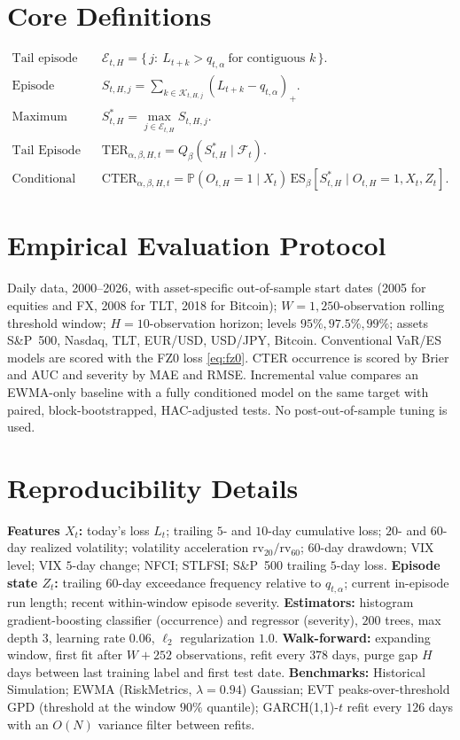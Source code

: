 \documentclass[11pt]{article}
\newcommand{\Prob}{\mathbb{P}}
\newcommand{\ES}{\mathrm{ES}}
\newcommand{\TER}{\mathrm{TER}}
\newcommand{\CTER}{\mathrm{CTER}}
\begin{document}
\appendix
\section{Core Definitions}\label{app:defs}
\begin{align*}
\text{Tail episode set:}\quad & \mathcal E_{t,H}=\{\,j:\ L_{t+k}>q_{t,\alpha}\ \text{for contiguous }k\,\}.\\
\text{Episode severity:}\quad & S_{t,H,j}=\sum_{k\in\mathcal K_{t,H,j}}(L_{t+k}-q_{t,\alpha})_+.\\
\text{Maximum episode severity:}\quad & S^{*}_{t,H}=\max_{j\in\mathcal E_{t,H}}S_{t,H,j}.\\
\text{Tail Episode Risk:}\quad & \TER_{\alpha,\beta,H,t}=Q_\beta(S^{*}_{t,H}\mid\mathcal F_t).\\
\text{Conditional TER:}\quad & \CTER_{\alpha,\beta,H,t}=\Prob(O_{t,H}=1\mid X_t)\,
\ES_\beta[S^{*}_{t,H}\mid O_{t,H}=1,X_t,Z_t].
\end{align*}

\section{Empirical Evaluation Protocol}\label{app:protocol}
Daily data, 2000--2026, with asset-specific out-of-sample start dates (2005 for equities and FX, 2008 for
TLT, 2018 for Bitcoin); $W=1{,}250$-observation rolling threshold window; $H=10$-observation
horizon; levels $95\%,97.5\%,99\%$; assets S\&P~500, Nasdaq, TLT, EUR/USD, USD/JPY, Bitcoin. Conventional
VaR/ES models are scored with the FZ0 loss \eqref{eq:fz0}. CTER occurrence is scored by Brier and AUC and
severity by MAE and RMSE. Incremental value compares an EWMA-only baseline with a fully conditioned model on
the same target with paired, block-bootstrapped, HAC-adjusted tests. No post-out-of-sample tuning is used.

\section{Reproducibility Details}\label{app:repro}
\textbf{Features $X_t$:} today's loss $L_t$; trailing $5$- and $10$-day cumulative loss; $20$- and $60$-day
realized volatility; volatility acceleration $\mathrm{rv}_{20}/\mathrm{rv}_{60}$; $60$-day drawdown; VIX
level; VIX $5$-day change; NFCI; STLFSI; S\&P~500 trailing $5$-day loss. \textbf{Episode state $Z_t$:}
trailing $60$-day exceedance frequency relative to $q_{t,\alpha}$; current in-episode run length; recent
within-window episode severity. \textbf{Estimators:} histogram gradient-boosting classifier (occurrence)
and regressor (severity), $200$ trees, max depth $3$, learning rate $0.06$, $\ell_2$ regularization $1.0$.
\textbf{Walk-forward:} expanding window, first fit after $W+252$ observations, refit every $378$ days, purge
gap $H$ days between last training label and first test date. \textbf{Benchmarks:} Historical Simulation;
EWMA (RiskMetrics, $\lambda=0.94$) Gaussian; EVT peaks-over-threshold GPD (threshold at the window $90\%$
quantile); GARCH(1,1)-$t$ refit every $126$ days with an $O(N)$ variance filter between refits.
\end{document}
